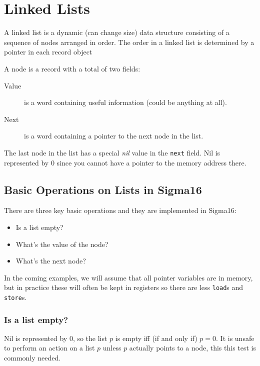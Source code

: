 \section{Linked Lists}\label{sec:linked_lists}

A linked list is a dynamic (can change size) data structure consisting of a sequence of nodes arranged in order.
The order in a linked list is determined by a pointer in each record object

A node is a record with a total of two fields:
\begin{description}
    \item[Value] is a word containing useful information (could be anything at all).
    \item[Next] is a word containing a pointer to the next node in the list.
\end{description}
%
The last node in the list has a special \emph{nil} value in the \texttt{next} field.
Nil is represented by \(0\) since you cannot have a pointer to the memory address there.

\subsection{Basic Operations on Lists in Sigma16}\label{sub:basic_operations_on_lists_in_sigma16}

There are three key basic operations and they are implemented in Sigma16:
\begin{itemize}
    \item Is a list empty?
    \item What's the value of the node?
    \item What's the next node?
\end{itemize}

\begin{note}
    In the coming examples, we will assume that all pointer variables are in memory, but in practice these will often be kept in registers so there are less \texttt{load}s and \texttt{store}s.
\end{note}

\subsubsection{Is a list empty?}\label{ssub:is_a_list_empty_}

Nil is represented by \(0\), so the list \(p\) is empty iff (if and only if) \(p=0\).
It is unsafe to perform an action on a list  \(p\) unless \(p\) actually points to a node, this this test is commonly needed.

